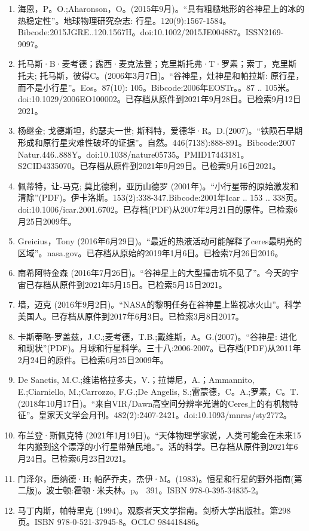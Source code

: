 \begin{enumerate}
\item 海恩，P。O.;Aharonson，O。(2015年9月)。“具有粗糙地形的谷神星上的冰的热稳定性”。地球物理研究杂志: 行星。120(9):1567-1584。Bibcode:2015JGRE..120.1567H。doi:10.1002/2015JE004887。ISSN2169-9097。 
\item 托马斯·B·麦考德；露西·麦克法登；克里斯托弗·T·罗素；索丁，克里斯托夫; 托马斯，彼得C。(2006年3月7日)。“谷神星，灶神星和帕拉斯: 原行星，而不是小行星”。Eos。87(10): 105。Bibcode:2006年EOSTr。。87 .. 105米。doi:10.1029/2006EO100002。已存档从原件到2021年9月28日。已检索9月12日2021。
\item 杨继金; 戈德斯坦，约瑟夫一世; 斯科特，爱德华·R。D.(2007)。“铁陨石早期形成和原行星灾难性破坏的证据”。自然。446(7138):888-891。Bibcode:2007 Natur.446..888Y。doi:10.1038/nature05735。PMID17443181。S2CID4335070。已存档从原件到2021年9月29日。已检索9月16日2021。  
\item 佩蒂特，让-马克; 莫比德利，亚历山德罗 (2001年)。“小行星带的原始激发和清除”(PDF)。伊卡洛斯。153(2):338-347.Bibcode:2001年Icar .. 153 .. 338页。doi:10.1006/icar.2001.6702。已存档(PDF)从2007年2月21日的原件。已检索6月25日2009年。
\item Greicius，Tony (2016年6月29日)。“最近的热液活动可能解释了ceres最明亮的区域”。nasa.gov。已存档从原始的2019年1月6日。已检索7月26日2016。
\item 南希阿特金森 (2016年7月26日)。“谷神星上的大型撞击坑不见了”。今天的宇宙已存档从原件到2021年5月15日。已检索5月15日2021。
\item 墙，迈克 (2016年9月2日)。“NASA的黎明任务在谷神星上监视冰火山”。科学美国人。已存档从原件到2017年6月3日。已检索3月8日2017。
\item 卡斯蒂略-罗盖兹，J.C.;麦考德，T.B.;戴维斯，A。G.(2007)。“谷神星: 进化和现状”(PDF)。月球和行星科学。三十八:2006-2007。已存档(PDF)从2011年2月24日的原件。已检索6月25日2009年。
\item De Sanctis, M.C.;维诺格拉多夫，V.；拉博尼，A.；Ammannito, E.;Ciarniello, M.;Carrozzo, F.G.;De Angelis, S.;雷蒙德，C。A.;罗素，C。T.(2018年10月17日)。“来自VIR/Dawn高空间分辨率光谱的Ceres上的有机物特征”。皇家天文学会月刊。482(2):2407-2421。doi:10.1093/mnras/sty2772。
\item 布兰登·斯佩克特 (2021年1月19日)。“天体物理学家说，人类可能会在未来15年内搬到这个漂浮的小行星带殖民地。”。活的科学。已存档从原件到2021年6月24日。已检索6月23日2021。
\item 门泽尔，唐纳德·H; 帕萨乔夫，杰伊·M。(1983)。恒星和行星的野外指南(第二版)。波士顿:霍顿·米夫林。p。 391。ISBN 978-0-395-34835-2。
\item 马丁内斯，帕特里克 (1994)。观察者天文学指南。剑桥大学出版社。第298页。ISBN 978-0-521-37945-8。OCLC 984418486。

\end{enumerate}

